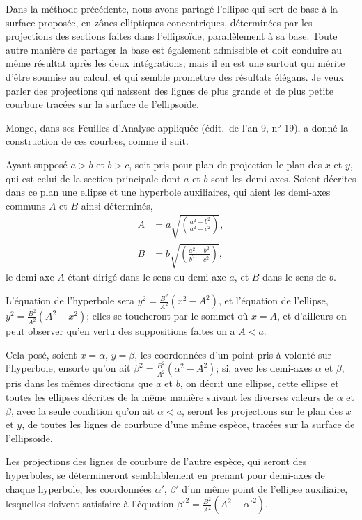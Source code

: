 \documentclass{article}
\begin{document}
Dans la méthode précédente, nous avons partagé l'ellipse qui sert de base à la surface proposée, en zônes elliptiques concentriques, déterminées par les projections des sections faites dans l'ellipsoïde, parallèlement à sa base. Toute autre manière de partager la base est également admissible et doit conduire au même résultat après les deux intégrations; mais il en est une surtout qui mérite d'être soumise au calcul, et qui semble promettre des résultats élégans. Je veux parler des projections qui naissent des lignes de plus grande et de plus petite courbure tracées sur la surface de l'ellipsoïde.

Monge, dans ses Feuilles d'Analyse appliquée (édit.\ de l'an 9, n° 19), a donné la construction de ces courbes, comme il suit.

Ayant supposé $a>b$ et $b>c$, soit pris pour plan de projection le plan des $x$ et $y$, qui est celui de la section principale dont $a$ et $b$ sont les demi-axes. Soient décrites dans ce plan une ellipse et une hyperbole auxiliaires, qui aient les demi-axes communs $A$ et $B$ ainsi déterminés,
\[ \begin{aligned} A&=a\sqrt{\left(\frac{a^{2}-b^{2}}{a^{2}-c^{2}}\right)},\\ B&=b\sqrt{\left(\frac{a^{2}-b^{2}}{b^{2}-c^{2}}\right)}, \end{aligned} \]
le demi-axe $A$ étant dirigé dans le sens du demi-axe $a$, et $B$ dans le sens de $b$.

L'équation de l'hyperbole sera $y^{2}=\frac{B^{2}}{A^{2}}(x^{2}-A^{2})$, et l'équation de l'ellipse, $y^{2}=\frac{B^{2}}{A^{2}}(A^{2}-x^{2})$; elles se toucheront par le sommet où $x=A$, et d'ailleurs on peut observer qu'en vertu des suppositions faites on a $A<a$.

Cela posé, soient $x=\alpha$, $y=\beta$, les coordonnées d'un point pris à volonté sur l'hyperbole, ensorte qu'on ait $\beta^{2}=\frac{B^{2}}{A^{2}}(\alpha^{2}-A^{2})$; si, avec les demi-axes $\alpha$ et $\beta$, pris dans les mêmes directions que $a$ et $b$, on décrit une ellipse, cette ellipse et toutes les ellipses décrites de la même manière suivant les diverses valeurs de $\alpha$ et $\beta$, avec la seule condition qu'on ait $\alpha<a$, seront les projections sur le plan des $x$ et $y$, de toutes les lignes de courbure d'une même espèce, tracées sur la surface de l'ellipsoïde.

Les projections des lignes de courbure de l'autre espèce, qui seront des hyperboles, se détermineront semblablement en prenant pour demi-axes de chaque hyperbole, les coordonnées $\alpha'$, $\beta'$ d'un même point de l'ellipse auxiliaire, lesquelles doivent satisfaire à l'équation $\beta'^{2}=\frac{B^{2}}{A^{2}}(A^{2}-\alpha'^{2})$.
\end{document}
